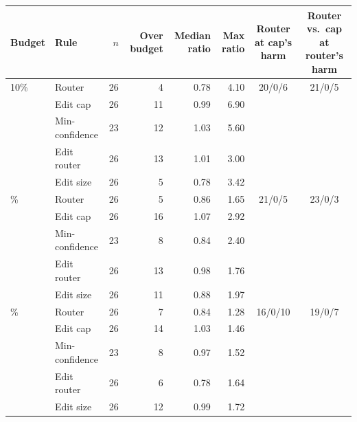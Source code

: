 \begin{tabular}{llrrrrcc}
\toprule
Budget & Rule & $n$ & Over budget & Median ratio & Max ratio & Router at cap's harm & Router vs.\ cap at router's harm \\
\midrule
10\% & Router & 26 & 4 & 0.78 & 4.10 & 20/0/6 & 21/0/5 \\
 & Edit cap & 26 & 11 & 0.99 & 6.90 &  &  \\
 & Min-confidence & 23 & 12 & 1.03 & 5.60 &  &  \\
 & Edit router & 26 & 13 & 1.01 & 3.00 &  &  \\
 & Edit size & 26 & 5 & 0.78 & 3.42 &  &  \\
\addlinespace[2pt]
25\% & Router & 26 & 5 & 0.86 & 1.65 & 21/0/5 & 23/0/3 \\
 & Edit cap & 26 & 16 & 1.07 & 2.92 &  &  \\
 & Min-confidence & 23 & 8 & 0.84 & 2.40 &  &  \\
 & Edit router & 26 & 13 & 0.98 & 1.76 &  &  \\
 & Edit size & 26 & 11 & 0.88 & 1.97 &  &  \\
\addlinespace[2pt]
50\% & Router & 26 & 7 & 0.84 & 1.28 & 16/0/10 & 19/0/7 \\
 & Edit cap & 26 & 14 & 1.03 & 1.46 &  &  \\
 & Min-confidence & 23 & 8 & 0.97 & 1.52 &  &  \\
 & Edit router & 26 & 6 & 0.78 & 1.64 &  &  \\
 & Edit size & 26 & 12 & 0.99 & 1.72 &  &  \\
\bottomrule
\end{tabular}
